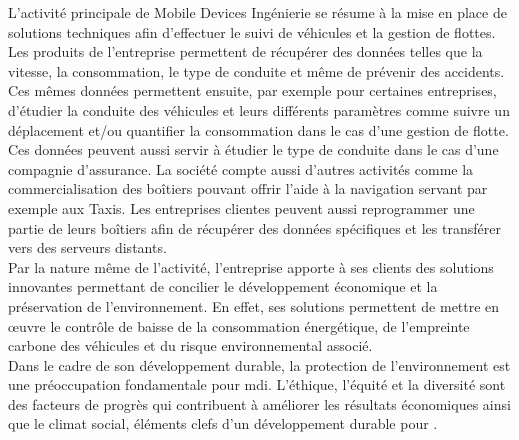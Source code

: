             L’activité principale de Mobile Devices Ingénierie se résume à la mise en place de solutions techniques 
            afin d’effectuer le suivi de véhicules et la gestion de flottes. Les produits de l'entreprise permettent 
            de récupérer des données telles que la vitesse, la consommation, le type de conduite et même de prévenir 
            des accidents.
            Ces mêmes données permettent ensuite, par exemple pour certaines entreprises, d’étudier la conduite 
            des véhicules et leurs différents paramètres comme suivre un déplacement et/ou quantifier la consommation 
            dans le cas d’une gestion de flotte. \\
            Ces données peuvent aussi servir à étudier le type de conduite dans le cas d’une compagnie d’assurance. 
            La société compte aussi d'autres activités comme la commercialisation des boîtiers pouvant offrir l’aide 
            à la navigation servant par exemple aux Taxis.
            Les entreprises clientes peuvent aussi reprogrammer une partie de leurs boîtiers afin de récupérer des données 
            spécifiques et les transférer vers des serveurs distants. \\

            Par la nature même de l’activité, l’entreprise apporte à ses clients des solutions
            innovantes permettant de concilier le développement économique et la préservation de l’environnement.
            En effet, ses solutions permettent de mettre en œuvre le contrôle
            de baisse de la consommation énergétique, de l’empreinte carbone des
            véhicules et du risque environnemental associé.\\[0.3cm]
            Dans le cadre de son développement durable, la protection de l’environnement est une
            préoccupation fondamentale pour \gls{mdi}. L’éthique, l’équité et la diversité sont des
            facteurs de progrès qui contribuent à améliorer les résultats économiques ainsi que le
            climat social, éléments clefs d’un développement durable pour \company{}.

